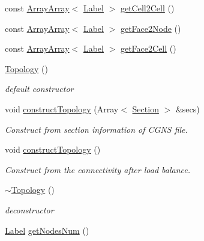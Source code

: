 \begin{DoxyCompactItemize}
\item 
const \hyperlink{classHSF_1_1ArrayArray}{ArrayArray}$<$ \hyperlink{namespaceHSF_ae65d72be782e989396ebe5ec6ae4c2b6}{Label} $>$ \hyperlink{classHSF_1_1Topology_a5ae4e7f4f97d8946a3319a642d0b37b9}{getCell2Cell} ()
\item 
const \hyperlink{classHSF_1_1ArrayArray}{ArrayArray}$<$ \hyperlink{namespaceHSF_ae65d72be782e989396ebe5ec6ae4c2b6}{Label} $>$ \hyperlink{classHSF_1_1Topology_a6e6fd144f43943e4cffbfda646441942}{getFace2Node} ()
\item 
const \hyperlink{classHSF_1_1ArrayArray}{ArrayArray}$<$ \hyperlink{namespaceHSF_ae65d72be782e989396ebe5ec6ae4c2b6}{Label} $>$ \hyperlink{classHSF_1_1Topology_a6265b70c435a5e60b8389dedbe880228}{getFace2Cell} ()
\item 
\hyperlink{classHSF_1_1Topology_a0248d01b1c87c4d1450771da9f841dee}{Topology} ()
\begin{DoxyCompactList}\small\item\em default constructor \item\end{DoxyCompactList}\item 
void \hyperlink{classHSF_1_1Topology_a95c9a7e1275aa1024ea624c3a2097f27}{constructTopology} (Array$<$ \hyperlink{classHSF_1_1Section}{Section} $>$ \&secs)
\begin{DoxyCompactList}\small\item\em Construct from section information of CGNS file. \item\end{DoxyCompactList}\item 
void \hyperlink{classHSF_1_1Topology_ab2ab89acd7b086d5b95a719f7869b896}{constructTopology} ()
\begin{DoxyCompactList}\small\item\em Construct from the connectivity after load balance. \item\end{DoxyCompactList}\item 
\hyperlink{classHSF_1_1Topology_a16f4d3d8b4a870cbd26794a1c8d3cc5c}{$\sim$Topology} ()
\begin{DoxyCompactList}\small\item\em deconstructor \item\end{DoxyCompactList}\item 
\hyperlink{namespaceHSF_ae65d72be782e989396ebe5ec6ae4c2b6}{Label} \hyperlink{classHSF_1_1Topology_a9a62513cf2963da4ab2bf58d46d6d9f7}{getNodesNum} ()

\end{DoxyCompactItemize}
